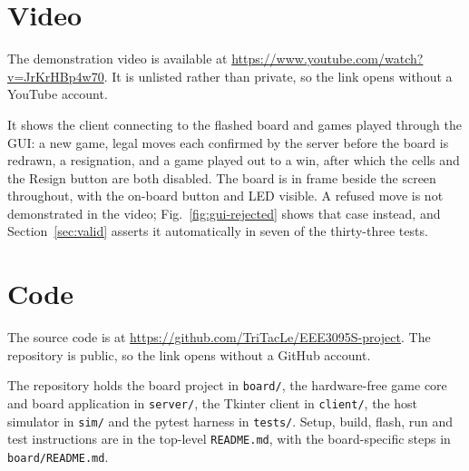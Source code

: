 \section{Video}
\label{sec:video}

The demonstration video is available at
\url{https://www.youtube.com/watch?v=JrKrHBp4w70}. It is unlisted rather than
private, so the link opens without a YouTube account.

It shows the client connecting to the flashed board and games played through
the GUI: a new game, legal moves each confirmed by the server before the board
is redrawn, a resignation, and a game played out to a win, after which the
cells and the Resign button are both disabled. The board is in frame beside the
screen throughout, with the on-board button and LED visible. A refused move is
not demonstrated in the video; Fig.~\ref{fig:gui-rejected} shows that case
instead, and Section~\ref{sec:valid} asserts it automatically in seven of the
thirty-three tests.

\section{Code}
\label{sec:code}

The source code is at \url{https://github.com/TriTacLe/EEE3095S-project}. The
repository is public, so the link opens without a GitHub account.

The repository holds the board project in \texttt{board/}, the hardware-free
game core and board application in \texttt{server/}, the Tkinter client in
\texttt{client/}, the host simulator in \texttt{sim/} and the pytest harness in
\texttt{tests/}. Setup, build, flash, run and test instructions are in the
top-level \texttt{README.md}, with the board-specific steps in
\texttt{board/README.md}.
